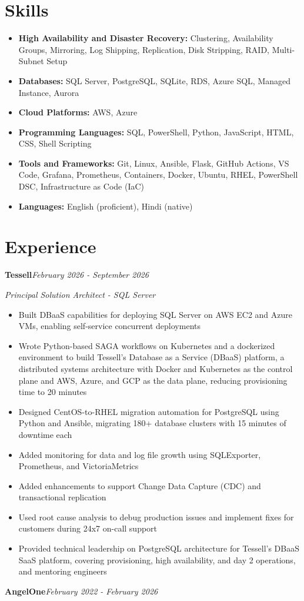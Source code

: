 \documentclass[10pt,a4paper]{article}
\begin{document}
\section{Skills}
\begin{itemize}
  \item \textbf{High Availability and Disaster Recovery:} Clustering, Availability Groups, Mirroring, Log Shipping, Replication, Disk Stripping, RAID, Multi-Subnet Setup
  \item \textbf{Databases:} SQL Server, PostgreSQL, SQLite, RDS, Azure SQL, Managed Instance, Aurora
  \item \textbf{Cloud Platforms:} AWS, Azure
  \item \textbf{Programming Languages:} SQL, PowerShell, Python, JavaScript, HTML, CSS, Shell Scripting
  \item \textbf{Tools and Frameworks:} Git, Linux, Ansible, Flask, GitHub Actions, VS Code, Grafana, Prometheus, Containers, Docker, Ubuntu, RHEL, PowerShell DSC, Infrastructure as Code (IaC)
  \item \textbf{Languages:} English (proficient), Hindi (native)
\end{itemize}

\section{Experience}

\noindent\textbf{Tessell}\hfill \textit{February 2026 - September 2026}

\textit{Principal Solution Architect - SQL Server}\\[-5pt]
\begin{itemize}
  \item Built DBaaS capabilities for deploying SQL Server on AWS EC2 and Azure VMs, enabling self-service concurrent deployments
  \item Wrote Python-based SAGA workflows on Kubernetes and a dockerized environment to build Tessell's Database as a Service (DBaaS) platform, a distributed systems architecture with Docker and Kubernetes as the control plane and AWS, Azure, and GCP as the data plane, reducing provisioning time to 20 minutes
  \item Designed CentOS-to-RHEL migration automation for PostgreSQL using Python and Ansible, migrating 180+ database clusters with 15 minutes of downtime each
  \item Added monitoring for data and log file growth using SQLExporter, Prometheus, and VictoriaMetrics
  \item Added enhancements to support Change Data Capture (CDC) and transactional replication
  \item Used root cause analysis to debug production issues and implement fixes for customers during 24x7 on-call support
  \item Provided technical leadership on PostgreSQL architecture for Tessell's DBaaS SaaS platform, covering provisioning, high availability, and day 2 operations, and mentoring engineers
\end{itemize}
\vspace{14.7pt}
\noindent\textbf{AngelOne}\hfill \textit{February 2022 - February 2026}
\end{document}

